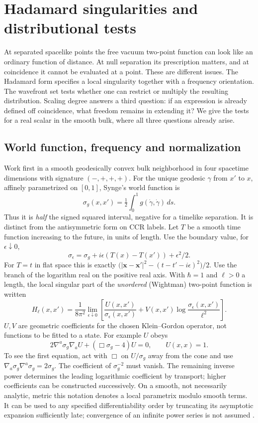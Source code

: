 \chapter{Hadamard singularities and distributional tests}\label{app:C}
At separated spacelike points the free vacuum two-point function can look
like an ordinary function of distance. At null separation its prescription
matters, and at coincidence it cannot be evaluated at a point. These are
different issues. The Hadamard form specifies a local singularity together
with a frequency orientation. The wavefront set tests whether one can
restrict or multiply the resulting distribution. Scaling degree answers a
third question: if an expression is already defined off coincidence, what
freedom remains in extending it? We give the tests for a real scalar in
the smooth bulk, where all three questions already arise.

\section{World function, frequency and normalization}
Work first in a smooth geodesically convex bulk neighborhood in four
spacetime dimensions with signature $(-,+,+,+)$. For the unique geodesic
$\gamma$ from $x'$ to $x$, affinely parametrized on $[0,1]$, Synge's world
function is
\[
 \sigma_g(x,x')=\tfrac12\int_0^1 g(\dot\gamma,\dot\gamma)\,ds .
\]
Thus it is \emph{half} the signed squared interval, negative for a timelike
separation. It is distinct from the antisymmetric form on CCR labels. Let
$T$ be a smooth time function increasing to the future, in units of length.
Use the boundary value, for $\epsilon\downarrow0$,
\[
 \sigma_\epsilon=\sigma_g+i\epsilon(T(x)-T(x'))+\epsilon^2/2 .
\]
For $T=t$ in flat space this is exactly
$\big(|\mathbf x-\mathbf x'|^2-(t-t'-i\epsilon)^2\big)/2$. Use the
branch of the logarithm real on the positive real axis. With $\hbar=1$ and
$\ell>0$ a length, the local singular part of the \emph{unordered}
(Wightman) two-point function is written
\begin{equation}
 H_\ell(x,x')=\frac{1}{8\pi^2}\lim_{\epsilon\downarrow0}
  \left[\frac{U(x,x')}{\sigma_\epsilon(x,x')}
    +V(x,x')\log\!\frac{\sigma_\epsilon(x,x')}{\ell^2}\right].
 \label{eq:C-hadamard}
\end{equation}
$U,V$ are geometric coefficients for the chosen Klein--Gordon operator,
not functions to be fitted to a state. For example $U$ obeys
\[
 2\nabla^a\sigma_g\nabla_a U+(\Box\sigma_g-4)U=0,\qquad U(x,x)=1 .
\]
To see the first equation, act with $\Box$ on $U/\sigma_g$ away from the
cone and use $\nabla_a\sigma_g\nabla^a\sigma_g=2\sigma_g$. The
coefficient of $\sigma_g^{-2}$ must vanish. The remaining inverse power
determines the leading logarithmic coefficient by transport; higher
coefficients can be constructed successively. On a smooth, not necessarily
analytic, metric this notation denotes a local parametrix modulo smooth
terms. It can be used to any specified differentiability order by
truncating its asymptotic expansion sufficiently late; convergence of an
infinite power series is not assumed \cite{WaldQFT,HWick}.

